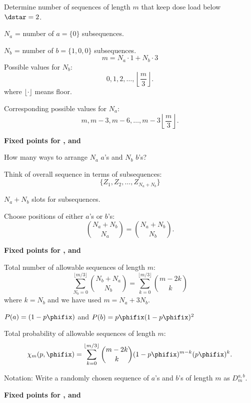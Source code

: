   
   Determine number of sequences of length $m$ that
    keep dose load below $\dstar=2$.
  
    $N_a$ = number of $a = \{0\}$ subsequences.
  
    $N_b$ = number of $b = \{1,0,0\}$ subsequences.
    {
      $$
      m = N_a \cdot 1 + N_b \cdot 3
      $$
    }
    {
      Possible values for $N_b$:
      $$
     0, 1, 2, \ldots, \left\lfloor\frac{m}{3}\right\rfloor.
      $$
      where $\lfloor\cdot \rfloor$ means floor.
    }
  
    {
      Corresponding possible values for $N_a$:
      $$
      m, m-3, m-6, \ldots, m-3\left\lfloor\frac{m}{3}\right\rfloor.
      $$
    }
  



  \textbf{Fixed points for , and }

  
  
    How many ways to arrange $N_a$ $a$'s and $N_b$ $b$'s?
   
    Think of overall sequence in terms of subsequences:
    $$ \{Z_1, Z_2, \ldots, Z_{N_a + N_b} \} $$
  
    $N_a + N_b$ slots for subsequences.
   
    Choose positions of either $a$'s or $b$'s:
    $$
    \binom{N_a + N_b}{N_a} = \binom{N_a + N_b}{N_b}.
    $$
  


  \textbf{Fixed points for , and }

  
  
    Total number of allowable sequences of length $m$:
    $$
    \sum_{N_b=0}^{\lfloor m/3\rfloor}
    \binom{N_b+N_a}{N_b}
    = 
    \sum_{k=0}^{\lfloor m/3\rfloor}
    \binom{m-2k}{k}
    $$
    where $k=N_b$ and we have used $m = N_a + 3N_b$.
  
    $P(a) = (1-p\phifix)$ and $P(b) = p\phifix(1-p\phifix)^2$
  
    Total probability of allowable sequences of length $m$:
    $$
    \chi_m(p,\phifix)
    = 
    \sum_{k=0}^{\lfloor m/3\rfloor}
    \binom{m-2k}{k}
    (1-p\phifix)^{m-k}
    (p\phifix)^k.
    $$
  
    Notation: Write a randomly chosen 
    sequence of $a$'s and $b$'s of length $m$
    as $D_{m}^{a,b}$.
  


  \textbf{Fixed points for , and }

  
  

